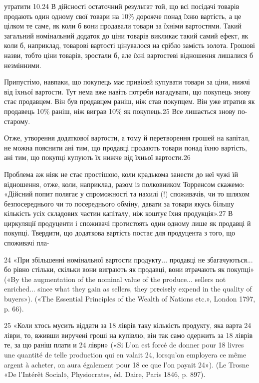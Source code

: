 утратити 10.24 В дійсності остаточний результат той, що всі посідачі
товарів продають один одному свої товари на 10\% дорожче
понад їхню вартість, а це цілком те саме, як коли б вони продавали
товари за їхніми вартостями. Такий загальний номінальний
додаток до ціни товарів викликає такий самий ефект, як коли б,
наприклад, товарові вартості цінувалося на срібло замість золота.
Грошові назви, тобто ціни товарів, зростали б, але їхні
вартостеві відношення лишалися б незмінними.

Припустімо, навпаки, що покупець має привілей купувати
товари за ціни, нижчі від їхньої вартости. Тут нема вже навіть
потреби нагадувати, що покупець знову стає продавцем. Він
був продавцем раніш, ніж став покупцем. Він уже втратив як
продавець 10\% раніш, ніж виграв 10\% як покупець.25  Все лишається
знову по-старому.

Отже, утворення додаткової вартости, а тому й перетворення
грошей на капітал, не можна пояснити ані тим, що продавці
продають товари понад їхню вартість, ані тим, що покупці купують
їх нижче від їхньої вартости.26

Проблема аж ніяк не стає простішою, коли крадькома занести
до неї чужі їй відношення, отже, коли, наприклад, разом із полковником
Торренсом скажемо: «Дійсний попит полягає у спроможності
та нахилі (!) споживачів, чи то шляхом безпосереднього
чи то посереднього обміну, давати за товари якусь більшу
кількість усіх складових частин капіталу, ніж коштує їхня продукція».27
В циркуляції продуценти і споживачі протистоять
один одному лише як продавці й покупці. Твердити, що додаткова
вартість постає для продуцента з того, що споживачі пла-

24 «При збільшенні номінальної вартости продукту... продавці не
збагачуються... бо рівно стільки, скільки вони виграють як продавці,
вони втрачають як покупці» («By the augmentation of the nominal value
of the produce... sellers not enriched... since what they gain as sellers, they
prеcisеly expend in the quality of buyers»). («The Essential Principles of
the Wealth of Nations etc.», London 1797, p. 66).

25 «Коли хтось мусить віддати за 18 ліврів таку кількість продукту,
яка варта 24 ліври, то, вживши виручені гроші на купівлю, він так само
одержить за 18 ліврів те, за що раніш плати и 24 ліври» («Si L’on est
forcé de donner pour 18 livres une quantité de telle production qui en valait
24, lorsqu’on employera ce même argent à acheter, on aura également pour
18 ce que l’on payait 24»). (Le Trosne «De l’Intérêt Social»,
Physiocrates, éd. Daire, Paris 1846, p. 897).

